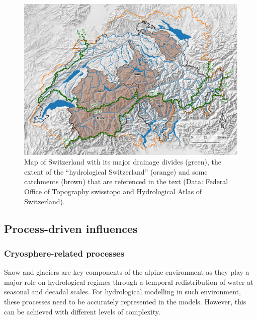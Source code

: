\documentclass[10pt,a4paper]{article}
\begin{document}
\begin{figure}[htb]
	\begin{center}
		\includegraphics[width=0.95\columnwidth]{figures/map}
		\caption{{Map of Switzerland with its major drainage divides (green), the extent of the ``hydrological Switzerland'' (orange) and some catchments (brown) that are referenced in the text (Data: Federal Office of Topography swisstopo and Hydrological Atlas of Switzerland). \label{fig:map}
		}}
	\end{center}
\end{figure}


\subsection{Process-driven influences}
\label{sec:application:processes}


\subsubsection{Cryosphere-related processes}
\label{sec:application:cryosphere}

Snow and glaciers are key components of the alpine environment as they play a major role on hydrological regimes through a temporal redistribution of water at seasonal and decadal scales. For hydrological modelling in such environment, these processes need to be accurately represented in the models. However, this can be achieved with different levels of complexity. 
\end{document}
